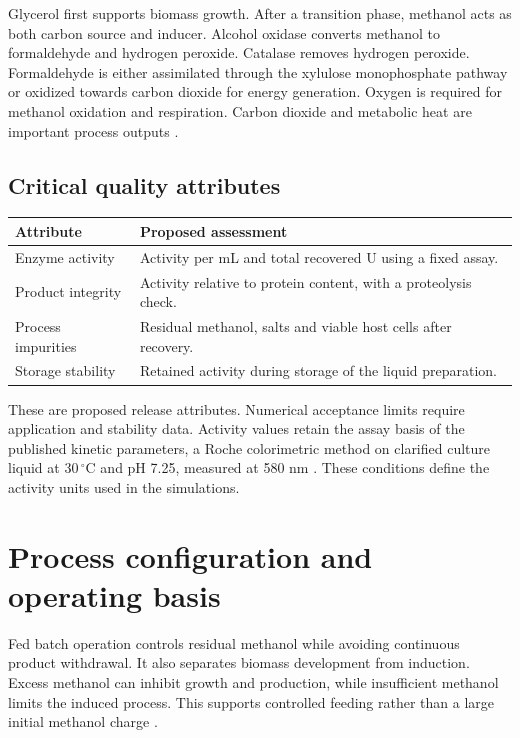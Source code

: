 \documentclass[12pt,a4paper]{article}
\newcommand{\tighttable}{\setstretch{1.07}}
\begin{document}
Glycerol first supports biomass growth. After a transition phase, methanol acts as both carbon source and inducer. Alcohol oxidase converts methanol to formaldehyde and hydrogen peroxide. Catalase removes hydrogen peroxide. Formaldehyde is either assimilated through the xylulose monophosphate pathway or oxidized towards carbon dioxide for energy generation. Oxygen is required for methanol oxidation and respiration. Carbon dioxide and metabolic heat are important process outputs \cite{PonteThesis}.

\subsection{Critical quality attributes}
\begin{center}\tighttable
\begin{tabularx}{\textwidth}{@{}L{0.28\textwidth}Y@{}}\toprule
Attribute & Proposed assessment\\\midrule
Enzyme activity & Activity per mL and total recovered U using a fixed assay.\\
Product integrity & Activity relative to protein content, with a proteolysis check.\\
Process impurities & Residual methanol, salts and viable host cells after recovery.\\
Storage stability & Retained activity during storage of the liquid preparation.\\\bottomrule
\end{tabularx}
\end{center}
These are proposed release attributes. Numerical acceptance limits require application and stability data. Activity values retain the assay basis of the published kinetic parameters, a Roche colorimetric method on clarified culture liquid at 30\,$^{\circ}$C and pH 7.25, measured at 580 nm \cite{PonteThesis}. These conditions define the activity units used in the simulations.

\newpage
\section{Process configuration and operating basis}
Fed batch operation controls residual methanol while avoiding continuous product withdrawal. It also separates biomass development from induction. Excess methanol can inhibit growth and production, while insufficient methanol limits the induced process. This supports controlled feeding rather than a large initial methanol charge \cite{Ponte2018}.
\end{document}
